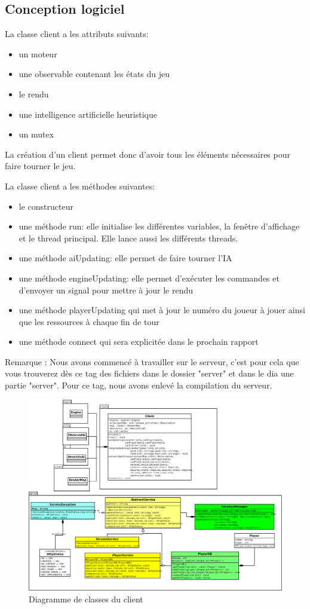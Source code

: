 \documentclass[12pt,a4paper]{article}
\begin{document}
\subsection{Conception logiciel}
La classe client a les attributs suivants:
\begin{itemize}
    \item un moteur
    \item une observable contenant les états du jeu
    \item le rendu
    \item une intelligence artificielle heuristique
    \item un mutex
\end{itemize}
La création d'un client permet donc d'avoir tous les éléments nécessaires pour faire tourner le jeu. 

La classe client a les méthodes suivantes:
\begin{itemize}
    \item le constructeur
    \item une méthode run: elle initialise les différentes variables, la fenêtre d'affichage et le thread principal. Elle lance aussi les différents threads.
    \item une méthode aiUpdating: elle permet de faire tourner l'IA 
    \item une méthode engineUpdating: elle permet d'exécuter les commandes et d'envoyer un signal pour mettre à jour le rendu
    \item une méthode playerUpdating qui met à jour le numéro du joueur à jouer ainsi que les ressources à chaque fin de tour
    \item une méthode connect qui sera explicitée dans le prochain rapport
\end{itemize}

Remarque : Nous avons commencé à travailler sur le serveur, c'est pour cela que vous trouverez dès ce tag des fichiers dans le dossier "server" et dans le dia une partie "server". Pour ce tag, nous avons enlevé la compilation du serveur. 

\begin{figure}[!ht]
\centering
    \includegraphics[width=1\textwidth]{ressources/module.png}
     \caption{Diagramme de classes du client}
\end{figure}
\end{document}
